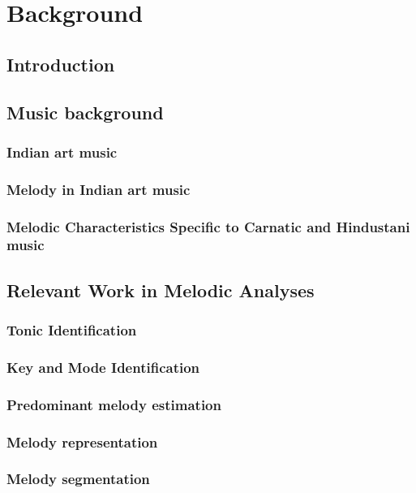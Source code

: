 
\chapter{Background}
\label{chap:background}

\section{Introduction}

\section{Music background}
\label{sec:music_background}

\subsection{Indian art music}
\subsection{Melody in Indian art music}
\subsection{Melodic Characteristics Specific to Carnatic and Hindustani music}

\section{Relevant Work in Melodic Analyses}
\subsection{Tonic Identification}
\subsection{Key and Mode Identification}
\subsection{Predominant melody estimation}
\subsection{Melody representation}
\subsection{Melody segmentation}
